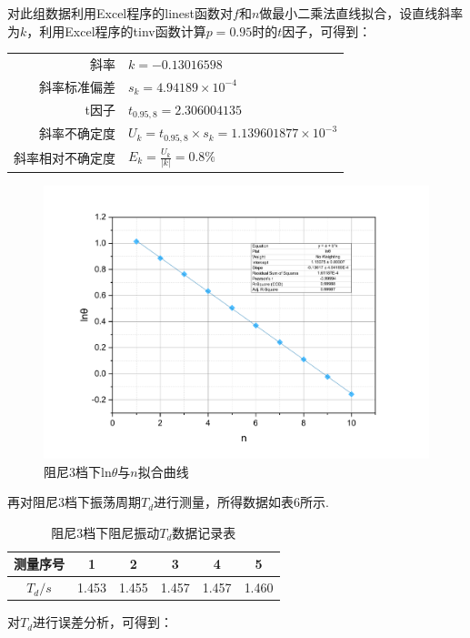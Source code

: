 \documentclass[UTF8]{ctexart}
\begin{document}
对此组数据利用Excel程序的linest函数对$f$和$n$做最小二乘法直线拟合，设直线斜率为$k$，利用Excel程序的tinv函数计算$p = 0.95$时的$t$因子，可得到：\par
\begin{center}\begin{tabular}{r l}
{斜率}& {$k=-0.13016598$}\\
{斜率标准偏差}& {$s_k=4.94189\times 10^{-4}$}\\
{t因子}& {$t_{0.95,8}=2.306004135$}\\
{斜率不确定度}& {$U_k=t_{0.95,8}\times s_k = 1.139601877\times 10^{-3}$}\\
{斜率相对不确定度}& {$E_k=\frac{U_k}{|k|}=0.8\%$}
\end{tabular}\end{center}
\begin{figure}\centering
{
\caption{阻尼3档下ln$\theta$与$n$拟合曲线}
\label{3_linear}
\includegraphics[scale=0.4]{3_linear.pdf}
}
\end{figure}
再对阻尼3档下振荡周期$T_{d}$进行测量，所得数据如表6所示. 
\begin{table}[H]
{\begin{center}{
\caption{阻尼3档下阻尼振动$T_d$数据记录表}
\begin{tabular}{|c|c|c|c|c|c|}
\hline
测量序号&1&2&3&4&5\\
\hline
$T_d/s$&1.453&1.455&1.457&1.457&1.460\\
\hline
\end{tabular}}\end{center}}\end{table}
对$T_{d}$进行误差分析，可得到：\par
\end{document}
